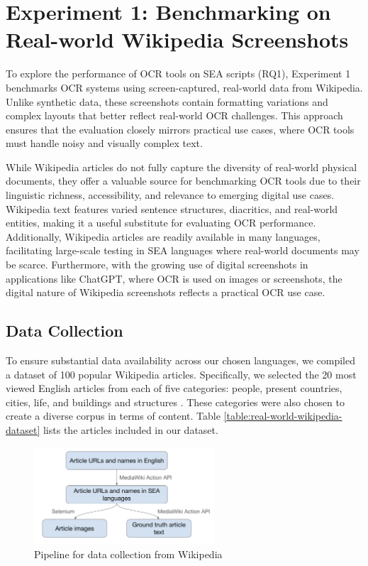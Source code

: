 \documentclass[12pt,oneside]{memoir}
\begin{document}
\section{Experiment 1: Benchmarking on Real-world Wikipedia Screenshots} \label{section:experiment-1}

To explore the performance of OCR tools on SEA scripts (RQ1), Experiment 1 benchmarks OCR systems using screen-captured, real-world data from Wikipedia.
Unlike synthetic data, these screenshots contain formatting variations and complex layouts that better reflect real-world OCR challenges. 
This approach ensures that the evaluation closely mirrors practical use cases, where OCR tools must handle noisy and visually complex text.

While Wikipedia articles do not fully capture the diversity of real-world physical documents, they offer a valuable source for benchmarking OCR tools due to their linguistic richness, accessibility, and relevance to emerging digital use cases. Wikipedia text features varied sentence structures, diacritics, and real-world entities, making it a useful substitute for evaluating OCR performance. Additionally, Wikipedia articles are readily available in many languages, facilitating large-scale testing in SEA languages where real-world documents may be scarce. Furthermore, with the growing use of digital screenshots in applications like ChatGPT, where OCR is used on images or screenshots, the digital nature of Wikipedia screenshots reflects a practical OCR use case.

\subsection{Data Collection}

To ensure substantial data availability across our chosen languages, we compiled a dataset of 100 popular Wikipedia articles. Specifically, we selected the 20 most viewed English articles from each of five categories: people, present countries, cities, life, and buildings and structures \parencite{wikipedia-popular-pages-2024}.
These categories were also chosen to create a diverse corpus in terms of content. 
Table \ref{table:real-world-wikipedia-dataset} lists the articles included in our dataset.

\begin{figure}[ht]
    \centering
    \includegraphics[width=0.6\textwidth]{images/data-collection.png}
    \caption{Pipeline for data collection from Wikipedia}
    \label{figure:data-collection}
\end{figure}
\end{document}
